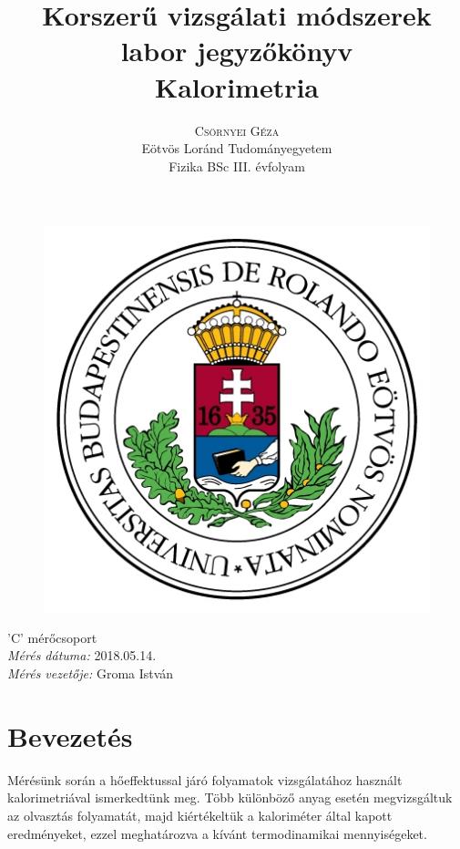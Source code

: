 \documentclass[12pt,a4paper]{article}
\title{\huge{Korszerű vizsgálati módszerek labor jegyzőkönyv}\\ \vspace{20pt}
\textbf{Kalorimetria}}
\author{\Large{\textsc{Csörnyei Géza}} \vspace{10pt}\\
	\textrm{Eötvös Loránd Tudományegyetem}\\
	\textrm{Fizika BSc III. évfolyam}
	}
\date{}
\begin{document}
\addtolength{\voffset}{-1.0cm}
\addtolength{\textheight}{1.0cm}
\begin{titlepage}
\maketitle

\begin{figure}[!htb]
\centering
\includegraphics[scale=0.6]{eltecimer.jpg}
\end{figure}

\hfil \Large{'C' mérőcsoport}\hfil  \\
\vspace*{2pt}
\hfil \Large{\emph{Mérés dátuma:} 2018.05.14.}\hfil \\
\vspace*{2pt}
\hfil \hspace*{45pt} \Large{\emph{Mérés vezetője:} Groma István}\hfil
\thispagestyle{empty}
\end{titlepage}

\section{Bevezetés}

\hspace*{10pt} Mérésünk során a hőeffektussal járó folyamatok vizsgálatához használt kalorimetriával ismerkedtünk meg. Több különböző anyag esetén megvizsgáltuk az olvasztás folyamatát, majd kiértékeltük a kaloriméter által kapott eredményeket, ezzel meghatározva a kívánt termodinamikai mennyiségeket.
\end{document}
